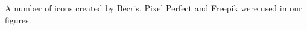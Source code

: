 \documentclass[\main/thesis.tex]{subfiles}
\begin{document}
\begin{acknowledgements} 

A number of icons created by Becris, Pixel Perfect and Freepik were used in our figures. 
\end{acknowledgements}
\end{document}
